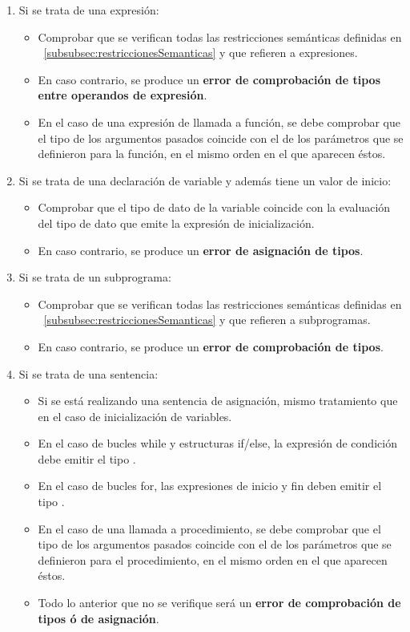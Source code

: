 \begin{enumerate}
    \item Si se trata de una expresión:
    \begin{itemize}
        \item Comprobar que se verifican todas las restricciones semánticas definidas en ~\ref{subsubsec:restriccionesSemanticas} y que refieren a expresiones.
        \item En caso contrario, se produce un \textbf{error de comprobación de tipos entre operandos de expresión}.
        \item En el caso de una expresión de llamada a función, se debe comprobar que el tipo de los argumentos pasados coincide con el de los parámetros que se definieron para la función, en el mismo orden en el que aparecen éstos.
    \end{itemize}
    \item Si se trata de una declaración de variable y además tiene un valor de inicio:
    \begin{itemize}
        \item Comprobar que el tipo de dato de la variable coincide con la evaluación del tipo de dato que emite la expresión de inicialización.
        \item En caso contrario, se produce un \textbf{error de asignación de tipos}.
    \end{itemize}
    \item Si se trata de un subprograma:
    \begin{itemize}
        \item Comprobar que se verifican todas las restricciones semánticas definidas en ~\ref{subsubsec:restriccionesSemanticas} y que refieren a subprogramas.
        \item En caso contrario, se produce un \textbf{error de comprobación de tipos}.
    \end{itemize}
    \item Si se trata de una sentencia:
    \begin{itemize}
        \item Si se está realizando una sentencia de asignación, mismo tratamiento que en el caso de inicialización de variables.
        \item En el caso de bucles while y estructuras if/else, la expresión de condición debe emitir el tipo .
        \item En el caso de bucles for, las expresiones de inicio y fin deben emitir el tipo .
        \item En el caso de una llamada a procedimiento, se debe comprobar que el tipo de los argumentos pasados coincide con el de los parámetros que se definieron para el procedimiento, en el mismo orden en el que aparecen éstos.
        \item Todo lo anterior que no se verifique será un \textbf{error de comprobación de tipos ó de asignación}.
    \end{itemize}
\end{enumerate}


